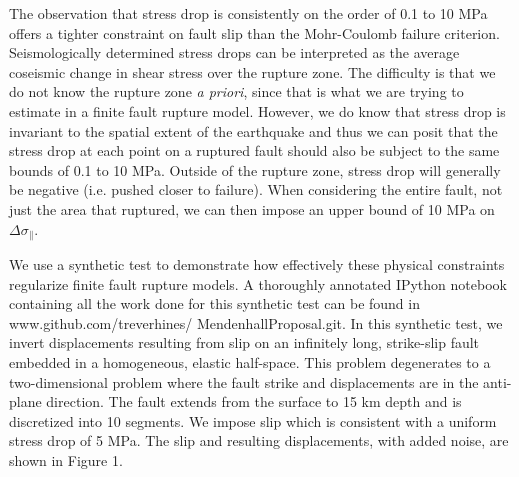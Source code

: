\documentclass[12pt]{article}
\begin{document}
The observation that stress drop is consistently on the order of 0.1 to 10 MPa offers a tighter constraint on fault slip than the Mohr-Coulomb failure criterion.  Seismologically determined stress drops can be interpreted as the average coseismic change in shear stress over the rupture zone.  The difficulty is that we do not know the rupture zone \textit{a priori}, since that is what we are trying to estimate in a finite fault rupture model.  However, we do know that stress drop is invariant to the spatial extent of the earthquake and thus we can posit that the stress drop at each point on a ruptured fault should also be subject to the same bounds of 0.1 to 10 MPa.  Outside of the rupture zone, stress drop will generally be negative (i.e. pushed closer to failure).  When considering the entire fault, not just the area that ruptured, we can then impose an upper bound of 10 MPa on $\Delta \sigma_\parallel$.  

We use a synthetic test to demonstrate how effectively these physical constraints regularize finite fault rupture models.  A thoroughly annotated IPython notebook containing all the work done for this synthetic test can be found in www.github.com/treverhines/ MendenhallProposal.git.  In this synthetic test, we invert displacements resulting from slip on an infinitely long, strike-slip fault embedded in a homogeneous, elastic half-space.  This problem degenerates to a two-dimensional problem where the fault strike and displacements are in the anti-plane direction.  The fault extends from the surface to 15 km depth and is discretized into 10 segments.  We impose slip which is consistent with a uniform stress drop of 5 MPa.  The slip and resulting displacements, with added noise, are shown in Figure 1.
\end{document}
